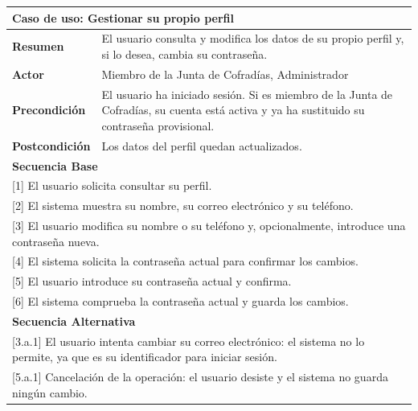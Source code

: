 \begin{table}[h!]
    \centering
    \renewcommand{\arraystretch}{1.5}

    \begin{tabular}{|p{4cm}|p{11cm}|}
        \hline
        \multicolumn{2}{|l|}{\textbf{Caso de uso: Gestionar su propio perfil}} \\
        \hline
        \textbf{Resumen} & El usuario consulta y modifica los datos de su propio perfil y, si lo desea, cambia su contraseña. \\
        \hline
        \textbf{Actor} & Miembro de la Junta de Cofradías, Administrador \\
        \hline
        \textbf{Precondición} & El usuario ha iniciado sesión. Si es miembro de la Junta de Cofradías, su cuenta está activa y ya ha sustituido su contraseña provisional. \\
        \hline
        \textbf{Postcondición} & Los datos del perfil quedan actualizados. \\
        \hline
        \multicolumn{2}{|l|}{\textbf{Secuencia Base}} \\
        \hline
        \multicolumn{2}{|p{15cm}|}{ [1] El usuario solicita consultar su perfil. } \\
        \hline
        \multicolumn{2}{|p{15cm}|}{ [2] El sistema muestra su nombre, su correo electrónico y su teléfono. } \\
        \hline
        \multicolumn{2}{|p{15cm}|}{ [3] El usuario modifica su nombre o su teléfono y, opcionalmente, introduce una contraseña nueva. } \\
        \hline
        \multicolumn{2}{|p{15cm}|}{ [4] El sistema solicita la contraseña actual para confirmar los cambios. } \\
        \hline
        \multicolumn{2}{|p{15cm}|}{ [5] El usuario introduce su contraseña actual y confirma. } \\
        \hline
        \multicolumn{2}{|p{15cm}|}{ [6] El sistema comprueba la contraseña actual y guarda los cambios. } \\
        \hline
        \multicolumn{2}{|l|}{\textbf{Secuencia Alternativa}} \\
        \hline
        \multicolumn{2}{|p{15cm}|}{ [3.a.1] El usuario intenta cambiar su correo electrónico: el sistema no lo permite, ya que es su identificador para iniciar sesión. } \\
        \hline
        \multicolumn{2}{|p{15cm}|}{ [5.a.1] Cancelación de la operación: el usuario desiste y el sistema no guarda ningún cambio. } \\

\end{tabular}
\end{table}
